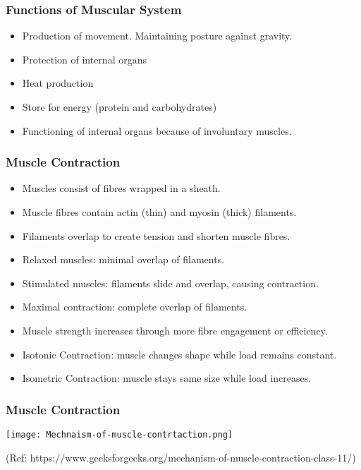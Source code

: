 \begin{frame}[fragile]\frametitle{Functions of Muscular System }

      \begin{itemize}
		\item Production of movement. Maintaining posture against gravity.
		\item Protection of internal organs
		\item Heat production
		\item Store for energy (protein and carbohydrates)
		\item Functioning of internal organs because of involuntary muscles.
	  \end{itemize}

\end{frame}

\begin{frame}[fragile]\frametitle{Muscle Contraction}

      \begin{itemize}
		\item Muscles consist of fibres wrapped in a sheath.
		\item Muscle fibres contain actin (thin) and myosin (thick) filaments.
		\item Filaments overlap to create tension and shorten muscle fibres.
		\item Relaxed muscles: minimal overlap of filaments.
		\item Stimulated muscles: filaments slide and overlap, causing contraction.
		\item Maximal contraction: complete overlap of filaments.
		\item Muscle strength increases through more fibre engagement or efficiency.
		\item Isotonic Contraction: muscle changes shape while load remains constant.
		\item Isometric Contraction: muscle stays same size while load increases.
	  \end{itemize}

\end{frame}

\begin{frame}[fragile]\frametitle{Muscle Contraction}

		\begin{center}
		\texttt{[image: Mechnaism-of-muscle-contrtaction.png]}
		
						
		{\tiny (Ref: https://www.geeksforgeeks.org/mechanism-of-muscle-contraction-class-11/)}		
		\end{center}	

\end{frame}

